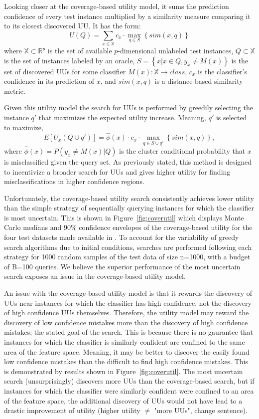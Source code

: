 \documentclass[letterpaper]{article} %
\newcommand{\km}[1]{{\color{red} #1}} %
\begin{document}
Looking closer at the coverage-based utility model, it sums the prediction confidence of every test instance multiplied by a similarity measure comparing it to its closest discovered UU.  It has the form: $$U(Q) = \sum_{x \in \mathbb{X}} c_x \cdot \max_{q \in S} \left\{sim\left(x,q \right) \right\}$$ where $\mathbb{X} \subset \mathbb{R}^p$ is the set of available $p$-dimensional unlabeled test instances, $Q \subset \mathbb{X}$ is the set of instances labeled by an oracle, $S = \left\{x|x \in Q, y_x \neq M(x)\right\}$ is the set of discovered UUs for some classifier $M(x):\mathbb{X} \rightarrow class$, $c_x$ is the classifier's confidence in its prediction of $x$, and $sim(x,q)$ is a distance-based similarity metric. 

Given this utility model the search for UUs is performed by greedily selecting the instance $q'$ that maximizes the expected utility increase.  Meaning, $q'$ is selected to maximize, $$E\left[U_x\left(Q \cup q'\right)\right] = \hat{\phi}(x) \cdot c_x \cdot \max_{q \in S \cup q'} \left\{sim\left(x,q \right) \right\},$$ where $\hat{\phi}(x) = P\left(y_x \neq M(x) |Q \right)$ is the cluster conditional probability that $x$ is misclassified given the query set.  As previously stated, this method is designed to incentivize a broader search for UUs and gives higher utility for finding misclassifications in higher confidence regions.  

Unfortunately, the coverage-based utility search consistently achieves lower utility than the simple strategy of sequentially querying instances for which the classifier is most uncertain.  This is shown in Figure~\ref{fig:coverutil} which displays Monte Carlo medians and 90\% confidence envelopes of the coverage-based utility for the four test datasets made available in \citet{Bansal2018}.  To account for the variability of greedy search algorithms due to initial conditions, searches are performed following each strategy for 1000 random samples of the test data of size n=1000, with a budget of B=100 queries.  We believe the superior performance of the most uncertain search exposes an issue in the coverage-based utility model.  


An issue with the coverage-based utility model is that it rewards the discovery of UUs near instances for which the classifier has high confidence, not the discovery of high confidence UUs themselves.  Therefore, the utility model may reward the discovery of low confidence mistakes more than the discovery of high confidence mistakes; the stated goal of the search. This is because there is no gaurantee that instances for which the classifier is similarly confident are confined to the same area of the feature space.  Meaning, it may be better to discover the easily found low confidence mistakes than the difficult to find high confidence mistakes. This is demonstrated by results shown in Figure~\ref{fig:coverutil}.  The most uncertain search (unsurprisingly) discovers more UUs than the coverage-based search, but if instances for which the classifier were similarly confident were confined to an area of the feature space, the additional discovery of UUs would not have lead to a drastic improvement of utility \km{(higher utility $\ne$ "more UUs", change sentence)}.
\end{document}
